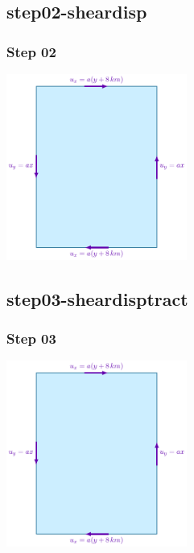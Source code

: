 \documentclass[aspectratio=169]{beamer}
\begin{document}
\subsection{step02-sheardisp}

\begin{frame}
  \frametitle{Step 02}

  \vfill
  \begin{center}
      \includegraphics[height=6.1cm]{figs/step02-diagram}
  \end{center}
\vfill
      
\end{frame}


\subsection{step03-sheardisptract}

\begin{frame}
  \frametitle{Step 03}

  \vfill
  \begin{center}
      \includegraphics[height=6.1cm]{figs/step02-diagram}
  \end{center}
\vfill
      
\end{frame}

\end{document}
